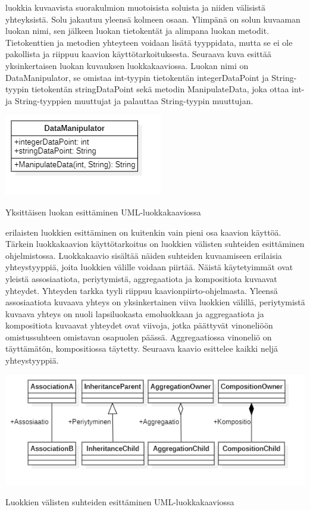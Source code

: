 \documentclass[a4paper,justified,notoc]{tufte-book}
\begin{document}
\begin{fullwidth}
 luokkia kuvaavista suorakulmion muotoisista soluista ja niiden
välisistä yhteyksistä. Solu jakautuu yleensä kolmeen osaan. Ylimpänä on solun kuvaaman luokan
nimi, sen jälkeen luokan tietokentät ja alimpana luokan metodit. Tietokenttien ja metodien
yhteyteen voidaan lisätä tyyppidata, mutta se ei ole pakollista ja riippuu kaavion
käyttötarkoituksesta. Seuraava kuva esittää yksinkertaisen luokan kuvauksen luokkakaaviossa.
Luokan nimi on DataManipulator, se omistaa int-tyypin tietokentän integerDataPoint ja
String-tyypin tietokentän stringDataPoint sekä metodin ManipulateData, joka ottaa int- ja
String-tyyppien muuttujat ja palauttaa String-tyypin muuttujan.

\begin{listing}
    \includegraphics{ClassDiagramExample1}
    \caption{Yksittäisen luokan esittäminen UML-luokkakaaviossa}
    \label{luokkakaavioluokka}
\end{listing}

 erilaisten luokkien esittäminen on kuitenkin vain pieni
osa kaavion käyttöä. Tärkein luokkakaavion käyttötarkoitus on luokkien välisten suhteiden
esittäminen ohjelmistossa. Luokkakaavio sisältää näiden suhteiden kuvaamiseen erilaisia
yhteystyyppiä, joita luokkien välille voidaan piirtää. Näistä käytetyimmät ovat yleistä
assosiaatiota, periytymistä, aggregaatiota ja kompositiota kuvaavat yhteydet. Yhteyden tarkka
tyyli riippuu kaavionpiirto-ohjelmasta. Yleensä assosiaatiota kuvaava yhteys on yksinkertainen
viiva luokkien välillä, periytymistä kuvaava yhteys on nuoli lapsiluokasta emoluokkaan ja
aggregaatiota ja kompositiota kuvaavat yhteydet ovat viivoja, jotka päättyvät vinoneliöön
omistussuhteen omistavan osapuolen päässä. Aggregaatiossa vinoneliö on täyttämätön,
kompositiossa täytetty. Seuraava kaavio esittelee kaikki neljä yhteystyyppiä.

\begin{listing}
    \includegraphics{ClassDiagramExample2}
    \caption{Luokkien välisten suhteiden esittäminen UML-luokkakaaviossa}
    \label{luokkakaavioluokka}
\end{listing}


\end{fullwidth}
\end{document}
